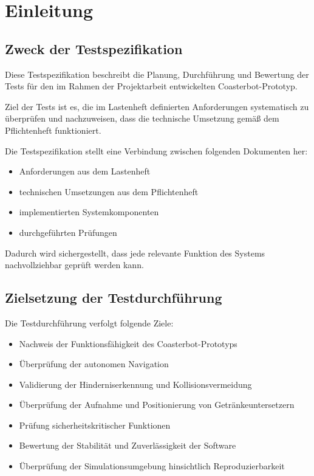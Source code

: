 \section{Einleitung}\label{einleitung}

\subsection{Zweck der
Testspezifikation}\label{zweck-der-testspezifikation}

Diese Testspezifikation beschreibt die Planung, Durchführung und
Bewertung der Tests für den im Rahmen der Projektarbeit entwickelten
Coasterbot-Prototyp.

Ziel der Tests ist es, die im Lastenheft definierten Anforderungen
systematisch zu überprüfen und nachzuweisen, dass die technische
Umsetzung gemäß dem Pflichtenheft funktioniert.

Die Testspezifikation stellt eine Verbindung zwischen folgenden
Dokumenten her:

\begin{itemize}
\tightlist
\item
  Anforderungen aus dem Lastenheft
\item
  technischen Umsetzungen aus dem Pflichtenheft
\item
  implementierten Systemkomponenten
\item
  durchgeführten Prüfungen
\end{itemize}

Dadurch wird sichergestellt, dass jede relevante Funktion des Systems
nachvollziehbar geprüft werden kann.

\subsection{Zielsetzung der
Testdurchführung}\label{zielsetzung-der-testdurchfuxfchrung}

Die Testdurchführung verfolgt folgende Ziele:

\begin{itemize}
\tightlist
\item
  Nachweis der Funktionsfähigkeit des Coasterbot-Prototyps
\item
  Überprüfung der autonomen Navigation
\item
  Validierung der Hinderniserkennung und Kollisionsvermeidung
\item
  Überprüfung der Aufnahme und Positionierung von Getränkeuntersetzern
\item
  Prüfung sicherheitskritischer Funktionen
\item
  Bewertung der Stabilität und Zuverlässigkeit der Software
\item
  Überprüfung der Simulationsumgebung hinsichtlich Reproduzierbarkeit
\end{itemize}

